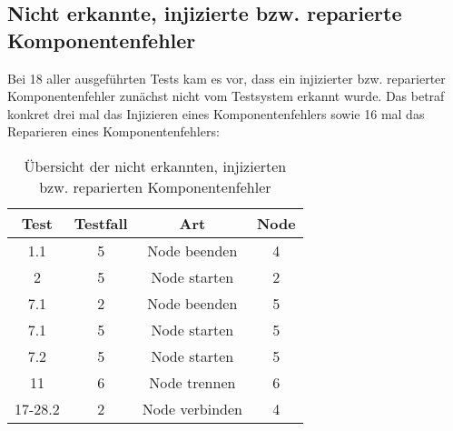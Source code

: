 \subsection{Nicht erkannte, injizierte bzw. reparierte Komponentenfehler}
\label{sec:notDetectedFaults}

Bei 18 aller ausgeführten Tests kam es vor, dass ein injizierter bzw. reparierter Komponentenfehler zunächst nicht vom Testsystem erkannt wurde.
Das betraf konkret drei mal das Injizieren eines Komponentenfehlers sowie 16 mal das Reparieren eines Komponentenfehlers:

\begin{table}[h]
    \begin{tabular}{c|ccc}
    	 Test   & Testfall &      Art       & Node \\ \hline
    	  1.1   &    5     &  Node beenden  &  4   \\
    	   2    &    5     &  Node starten  &  2   \\
    	  7.1   &    2     &  Node beenden  &  5   \\
    	  7.1   &    5     &  Node starten  &  5   \\
    	  7.2   &    5     &  Node starten  &  5   \\
    	  11    &    6     &  Node trennen  &  6   \\
    	17-28.2 &    2     & Node verbinden &  4
    \end{tabular} 
    \caption{Übersicht der nicht erkannten, injizierten bzw. reparierten Komponentenfehler}
    \label{tab:notDetectedFaults}
\end{table}

